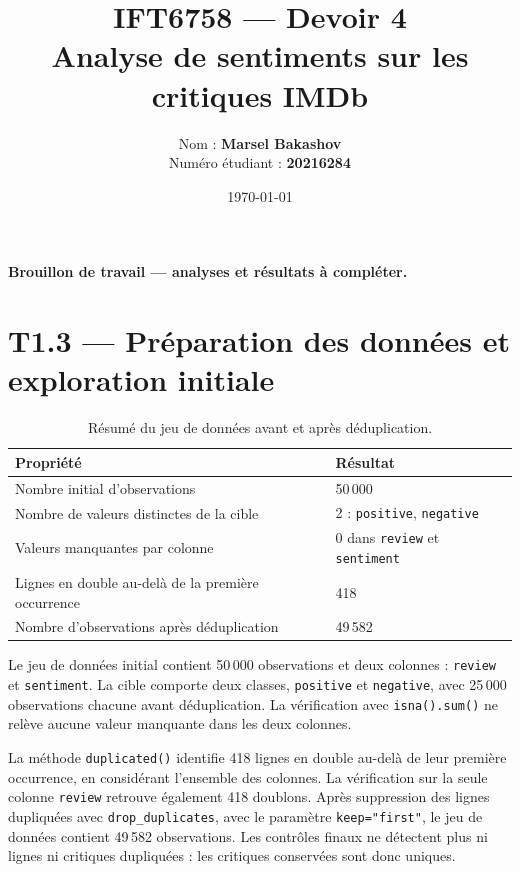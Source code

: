 \documentclass[11pt,a4paper]{article}
\title{IFT6758 --- Devoir 4\\Analyse de sentiments sur les critiques IMDb}
\author{Nom : \textbf{Marsel Bakashov}\\Numéro étudiant : \textbf{20216284}}
\date{\today}
\begin{document}
\maketitle
\noindent\textbf{Brouillon de travail --- analyses et résultats à compléter.}
\tableofcontents
\newpage

\section*{T1.3 --- Préparation des données et exploration initiale}

\begin{table}[htbp]
\centering
\begin{tabular}{ll}
\toprule
Propriété & Résultat \\
\midrule
Nombre initial d'observations & 50\,000 \\
Nombre de valeurs distinctes de la cible & 2 : \texttt{positive}, \texttt{negative} \\
Valeurs manquantes par colonne & 0 dans \texttt{review} et \texttt{sentiment} \\
Lignes en double au-delà de la première occurrence & 418 \\
Nombre d'observations après déduplication & 49\,582 \\
\bottomrule
\end{tabular}
\caption{Résumé du jeu de données avant et après déduplication.}
\end{table}

Le jeu de données initial contient 50\,000 observations et deux colonnes :
\texttt{review} et \texttt{sentiment}. La cible comporte deux classes,
\texttt{positive} et \texttt{negative}, avec 25\,000 observations chacune
avant déduplication. La vérification avec \texttt{isna().sum()} ne relève
aucune valeur manquante dans les deux colonnes.

La méthode \texttt{duplicated()} identifie 418 lignes en double au-delà de
leur première occurrence, en considérant l'ensemble des colonnes.
La vérification sur la seule colonne \texttt{review} retrouve également
418 doublons. Après suppression des lignes dupliquées avec
\texttt{drop\_duplicates}, avec le paramètre \texttt{keep="first"}, le jeu de données contient
49\,582 observations. Les contrôles finaux ne détectent plus ni lignes
ni critiques dupliquées : les critiques conservées sont donc uniques.
\end{document}

